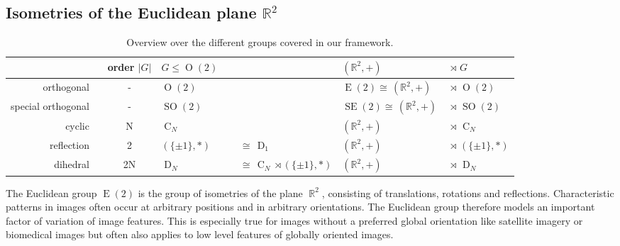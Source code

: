 \documentclass{article}
\DeclareMathOperator*{\R}{\mathbb{R}}
\newcommand{\E}[1]{\ensuremath{\operatorname{E}(#1)}}
\newcommand{\SE}[1]{\ensuremath{\operatorname{SE}(#1)}}
\renewcommand{\O}[1]{\ensuremath{\operatorname{O}(#1)}}
\newcommand{\SO}[1]{\ensuremath{\operatorname{SO}(#1)}}
\newcommand{\D}[1]{\ensuremath{\operatorname{D}_{#1}}}
\newcommand{\DN}{\ensuremath{\operatorname{D}_{\!N}}}
\newcommand{\CN}{\ensuremath{\operatorname{C}_{\!N}}}
\newlength{\secBefore}
\newlength{\secAfter}
\newlength{\subsecBefore}
\newlength{\subsecAfter}
\begin{document}
\vspace*{\subsecBefore}
\subsection{Isometries of the Euclidean plane $\mathbb{R}^2$}
\label{sec:euclidean_group}
\vspace*{\subsecAfter}

\begin{table}
 
\def\arraystretch{1.35}
\centering
\begin{tabular}{rcMN}
                       \ & order $|G|$ & $G\leq\!\O2$   \ &                                      &            $(\mathbb{R}^2,+)$ & $\,\rtimes\, G            $ \\ \hline
    orthogonal         \ & -           & $\O2$          \ &                                      & $\E2 \cong\,(\mathbb{R}^2,+)$ & $\,\rtimes\, \O2          $ \\
special orthogonal \ & -           & $\SO2$         \ &                                      & $\SE2\cong\,(\mathbb{R}^2,+)$ & $\,\rtimes\, \SO2         $ \\
    cyclic             \ & N           & $\CN$          \ &                                      &            $(\mathbb{R}^2,+)$ & $\,\rtimes\, \CN          $ \\
    reflection         \ & 2           & $(\{\pm1\},*)$ \ & $\ \cong\, \D1$                    &            $(\mathbb{R}^2,+)$ & $\,\rtimes\, (\{\pm1\},*) $ \\
    dihedral           \ & 2N          & $\DN$          \ & $\ \cong\, \CN\rtimes(\{\pm1\},*)$ &            $(\mathbb{R}^2,+)$ & $\,\rtimes\, \DN          $ \\
\end{tabular}
\vspace*{1ex}
\caption{Overview over the different groups covered in our framework.}
\label{tab:groups_arxiv}
\vspace*{-5ex}
\end{table}

The Euclidean group $\E2$ is the group of isometries of the plane $\R^2$, consisting of translations, rotations and reflections.
Characteristic patterns in images often occur at arbitrary positions and in arbitrary orientations.
The Euclidean group therefore models an important factor of variation of image features.
This is especially true for images without a preferred global orientation like satellite imagery or biomedical images but often also applies to low level features of globally oriented images.
\end{document}
